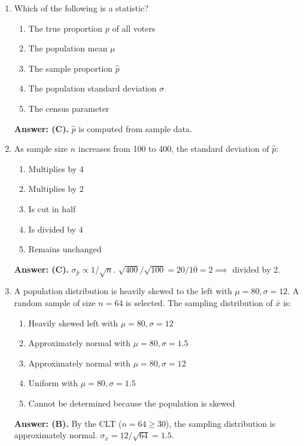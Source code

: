 \begin{enumerate}[leftmargin=1.5em]
  \item Which of the following is a statistic?
  \begin{enumerate}[label=(\Alph*)]
    \item The true proportion $p$ of all voters \item The population mean $\mu$ \item The sample proportion $\hat{p}$ \item The population standard deviation $\sigma$ \item The census parameter
  \end{enumerate}
  \textbf{Answer: (C).} $\hat{p}$ is computed from sample data.

  \item As sample size $n$ increases from 100 to 400, the standard deviation of $\hat{p}$:
  \begin{enumerate}[label=(\Alph*)]
    \item Multiplies by 4 \item Multiplies by 2 \item Is cut in half \item Is divided by 4 \item Remains unchanged
  \end{enumerate}
  \textbf{Answer: (C).} $\sigma_{\hat{p}} \propto 1/\sqrt{n}$. $\sqrt{400}/\sqrt{100} = 20/10 = 2 \implies$ divided by 2.

  \item A population distribution is heavily skewed to the left with $\mu = 80, \sigma = 12$. A random sample of size $n = 64$ is selected. The sampling distribution of $\bar{x}$ is:
  \begin{enumerate}[label=(\Alph*)]
    \item Heavily skewed left with $\mu = 80, \sigma = 12$
    \item Approximately normal with $\mu = 80, \sigma = 1.5$
    \item Approximately normal with $\mu = 80, \sigma = 12$
    \item Uniform with $\mu = 80, \sigma = 1.5$
    \item Cannot be determined because the population is skewed
  \end{enumerate}
  \textbf{Answer: (B).} By the CLT ($n = 64 \ge 30$), the sampling distribution is approximately normal. $\sigma_{\bar{x}} = 12/\sqrt{64} = 1.5$.


\end{enumerate}
